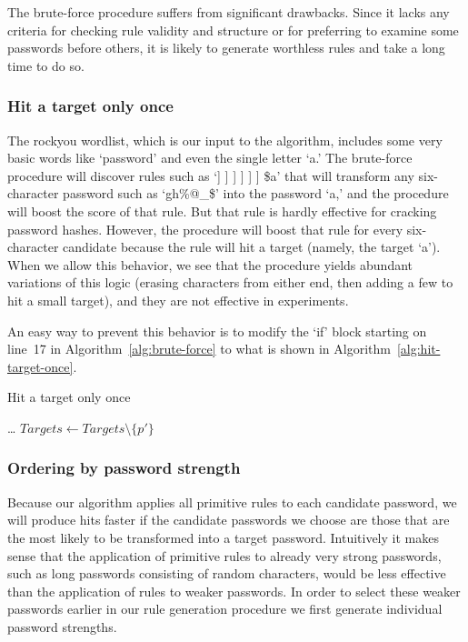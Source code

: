 \documentclass[letterpaper,twocolumn,10pt]{article}
\begin{document}
The brute-force procedure suffers from significant drawbacks. Since it lacks
any criteria for checking rule validity and structure or for preferring to
examine some passwords before others, it is likely to generate worthless rules
and take a long time to do so.

\subsubsection{Hit a target only once}

The rockyou wordlist, which is our input to the algorithm, includes some very
basic words like `password' and even the single letter `a.' The brute-force
procedure will discover rules such as `] ] ] ] ] ] \$a' that will transform any
six-character password such as `gh\%@\_\$' into the password `a,' and the
procedure will boost the score of that rule. But that rule is hardly effective
for cracking password hashes. However, the procedure will boost that rule for
every six-character candidate because the rule will hit a target (namely, the
target `a'). When we allow this behavior, we see that the procedure yields
abundant variations of this logic (erasing characters from either end, then
adding a few to hit a small target), and they are not effective in experiments.

An easy way to prevent this behavior is to modify the `if' block starting on
line~17 in Algorithm~\ref{alg:brute-force} to what is shown in
Algorithm~\ref{alg:hit-target-once}.

\begin{algorithm}\caption{Hit a target only once}
\begin{algorithmic}
        \State \dots
      \EndFor
      \State $Targets \gets Targets \setminus \{p'\}$
    \EndIf
\end{algorithmic}
\label{alg:hit-target-once}
\end{algorithm}

\subsubsection{Ordering by password strength}

Because our algorithm applies all primitive rules to each candidate password,
we will produce hits faster if the candidate passwords we choose are those that
are the most likely to be transformed into a target password. Intuitively it makes
sense that the application of primitive rules to already very strong passwords, such as long
passwords consisting of random characters, would be less effective than the application
of rules to weaker passwords. In order to select these weaker passwords earlier in
our rule generation procedure we first generate individual password strengths.
\end{document}
